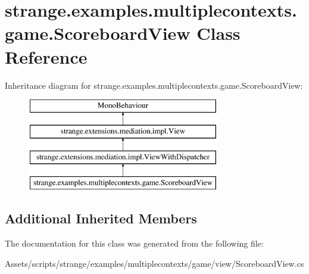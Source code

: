 \hypertarget{classstrange_1_1examples_1_1multiplecontexts_1_1game_1_1_scoreboard_view}{\section{strange.\-examples.\-multiplecontexts.\-game.\-Scoreboard\-View Class Reference}
\label{classstrange_1_1examples_1_1multiplecontexts_1_1game_1_1_scoreboard_view}
}
Inheritance diagram for strange.\-examples.\-multiplecontexts.\-game.\-Scoreboard\-View\-:\begin{figure}[H]
\begin{center}
\leavevmode
\includegraphics[height=4.000000cm]{classstrange_1_1examples_1_1multiplecontexts_1_1game_1_1_scoreboard_view}
\end{center}
\end{figure}
\subsection*{Additional Inherited Members}


The documentation for this class was generated from the following file\-:\begin{DoxyCompactItemize}
\item 
Assets/scripts/strange/examples/multiplecontexts/game/view/Scoreboard\-View.\-cs\end{DoxyCompactItemize}
